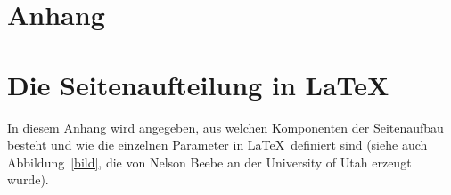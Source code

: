 
\clearpage

\section*{Anhang}

\appendix

\section{Die Seitenaufteilung in \LaTeX}

In diesem Anhang wird angegeben, aus welchen Komponenten der 
Seitenaufbau besteht und wie die einzelnen Parameter in \LaTeX\ 
definiert sind (siehe auch  
Abbildung~\ref{bild}, die von Nelson Beebe an der University of Utah 
erzeugt wurde).


